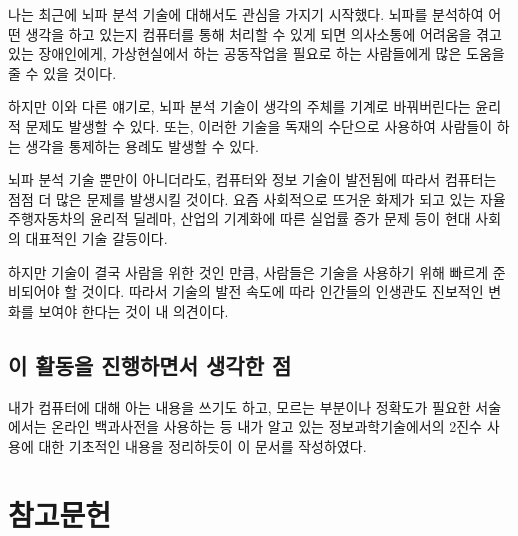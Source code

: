 \documentclass{article}
\begin{document}
나는 최근에 뇌파 분석 기술에 대해서도 관심을 가지기 시작했다.
뇌파를 분석하여 어떤 생각을 하고 있는지 컴퓨터를 통해 처리할 수 있게 되면
의사소통에 어려움을 겪고 있는 장애인에게, 가상현실에서 하는 공동작업을 필요로 하는 사람들에게
많은 도움을 줄 수 있을 것이다.

하지만 이와 다른 얘기로, 뇌파 분석 기술이 생각의 주체를 기계로 바꿔버린다는 윤리적 문제도
발생할 수 있다.
또는, 이러한 기술을 독재의 수단으로 사용하여 사람들이 하는 생각을 통제하는 용례도 발생할 수 있다.

뇌파 분석 기술 뿐만이 아니더라도, 컴퓨터와 정보 기술이 발전됨에 따라서 컴퓨터는 점점
더 많은 문제를 발생시킬 것이다.
요즘 사회적으로 뜨거운 화제가 되고 있는 자율주행자동차의 윤리적 딜레마,
산업의 기계화에 따른 실업률 증가 문제 등이 현대 사회의 대표적인 기술 갈등이다.

하지만 기술이 결국 사람을 위한 것인 만큼, 사람들은 기술을 사용하기 위해 빠르게 준비되어야 할 것이다.
따라서 기술의 발전 속도에 따라 인간들의 인생관도 진보적인 변화를 보여야 한다는 것이 내 의견이다.

\subsection{이 활동을 진행하면서 생각한 점}

내가 컴퓨터에 대해 아는 내용을 쓰기도 하고, 모르는 부분이나 정확도가 필요한 서술에서는
온라인 백과사전을 사용하는 등 내가 알고 있는 정보과학기술에서의 2진수 사용에 대한 기초적인 내용을
정리하듯이 이 문서를 작성하였다.

\section{참고문헌}
\end{document}
